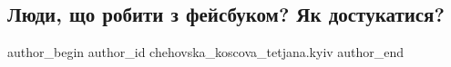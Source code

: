  
 
 
 
 
 
\subsection{Люди, що робити з фейсбуком? Як достукатися?}
\label{sec:17_09_2022.fb.chehovska_koscova_tetjana.kyiv.1.facebook}
 
\ifcmt
 author_begin
   author_id chehovska_koscova_tetjana.kyiv
 author_end
\fi

